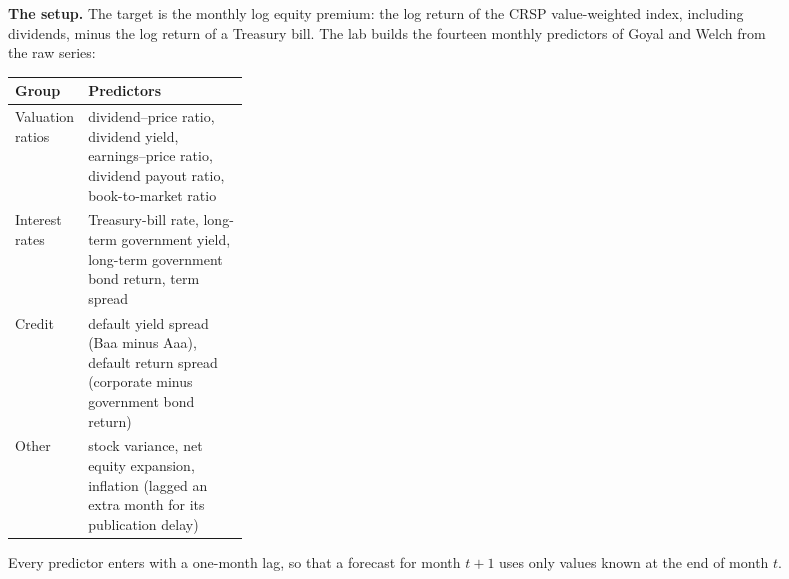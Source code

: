 \begin{figure}[htbp]
\textbf{The setup.} The target is the monthly log equity premium: the log return of the CRSP value-weighted index, including dividends, minus the log return of a Treasury bill. The lab builds the fourteen monthly predictors of Goyal and Welch from the raw series:

\begin{center}
\small
\begin{tabularx}{0.9\linewidth}{@{}>{\raggedright\arraybackslash}p{0.30\linewidth}>{\raggedright\arraybackslash}X@{}}
\toprule
Group & Predictors \\
\midrule
Valuation ratios & dividend--price ratio, dividend yield, earnings--price ratio, dividend payout ratio, book-to-market ratio \\
Interest rates & Treasury-bill rate, long-term government yield, long-term government bond return, term spread \\
Credit & default yield spread (Baa minus Aaa), default return spread (corporate minus government bond return) \\
Other & stock variance, net equity expansion, inflation (lagged an extra month for its publication delay) \\
\bottomrule
\end{tabularx}
\end{center}

Every predictor enters with a one-month lag, so that a forecast for month $t+1$ uses only values known at the end of month $t$.


\end{figure}
